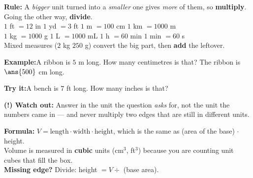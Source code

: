\documentclass[12pt]{article}
\begin{document}


\begin{formulabox}
\textbf{Rule:} A \emph{bigger} unit turned into a \emph{smaller} one gives
\emph{more} of them, so \textbf{multiply}. Going the other way,
\textbf{divide}.\\[3pt]
$1$ ft $=12$ in \quad $1$ yd $=3$ ft \quad $1$ m $=100$ cm \quad
$1$ km $=1000$ m\\
$1$ kg $=1000$ g \quad $1$ L $=1000$ mL \quad $1$ h $=60$ min \quad
$1$ min $=60$ s\\[3pt]
Mixed measures ($2$ kg $250$ g) convert the big part, then \textbf{add} the
leftover.
\end{formulabox}

\begin{examplebox}
\textbf{Example:}\quad A ribbon is $5$ m long. How many centimetres is that?
The ribbon is $\ans{500}$ cm long.
\end{examplebox}

\begin{tryitbox}
\textbf{Try it:}\quad A bench is $7$ ft long. How many inches is that?\\[2pt]
\end{tryitbox}

\begin{watchoutbox}
\textbf{(!) Watch out:} Answer in the unit the question \emph{asks} for, not the
unit the numbers came in --- and never multiply two edges that are still in
different units.
\end{watchoutbox}


\begin{formulabox}
\textbf{Formula:} $V = \text{length} \cdot \text{width} \cdot \text{height}$,
which is the same as (area of the base) $\cdot$ height.\\[3pt]
Volume is measured in \textbf{cubic} units (cm$^3$, ft$^3$) because you are
counting unit cubes that fill the box.\\[3pt]
\textbf{Missing edge?} Divide: height $=V \div$ (base area).
\end{formulabox}
\end{document}
